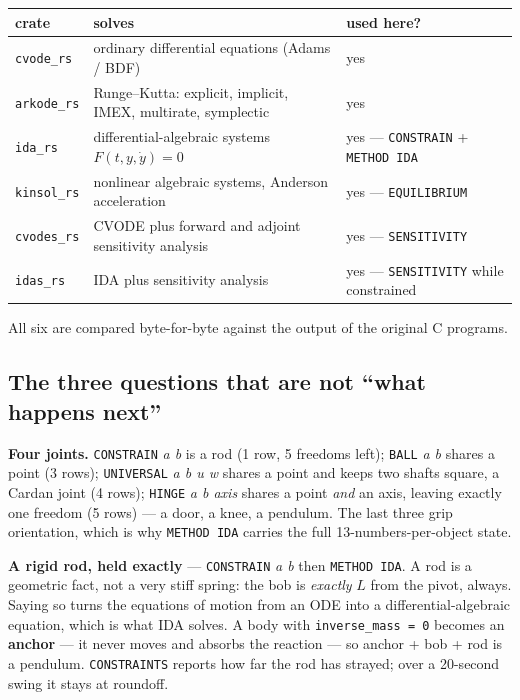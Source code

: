 \documentclass[11pt]{article}
\newcommand{\kw}[1]{\texttt{\uppercase{#1}}}
\newcommand{\code}[1]{\texttt{#1}}
\begin{document}
\begin{center}
\begin{tabular}{lll}
\textbf{crate} & \textbf{solves} & \textbf{used here?}\\\hline
\code{cvode\_rs}  & ordinary differential equations (Adams / BDF) & yes\\
\code{arkode\_rs} & Runge--Kutta: explicit, implicit, IMEX, multirate, symplectic & yes\\
\code{ida\_rs}    & differential-algebraic systems $F(t,y,\dot y)=0$ & yes --- \kw{constrain} + \kw{method ida}\\
\code{kinsol\_rs} & nonlinear algebraic systems, Anderson acceleration & yes --- \kw{equilibrium}\\
\code{cvodes\_rs} & CVODE plus forward and adjoint sensitivity analysis & yes --- \kw{sensitivity}\\
\code{idas\_rs}   & IDA plus sensitivity analysis & yes --- \kw{sensitivity} while constrained\\
\end{tabular}
\end{center}

All six are compared byte-for-byte against the output of the original C
programs.

\subsection{The three questions that are not ``what happens next''}

\textbf{Four joints.} \kw{constrain} \emph{a b} is a rod (1 row, 5
freedoms left); \kw{ball} \emph{a b} shares a point (3 rows);
\kw{universal} \emph{a b u w} shares a point and keeps two shafts square,
a Cardan joint (4 rows); \kw{hinge} \emph{a b axis} shares a point
\emph{and} an axis, leaving exactly one freedom (5 rows) --- a door, a
knee, a pendulum. The last three grip orientation, which is why
\kw{method ida} carries the full 13-numbers-per-object state.

\textbf{A rigid rod, held exactly} --- \kw{constrain} \emph{a b} then
\kw{method ida}. A rod is a geometric fact, not a very stiff spring: the
bob is \emph{exactly} $L$ from the pivot, always. Saying so turns the
equations of motion from an ODE into a differential-algebraic equation,
which is what IDA solves. A body with \code{inverse\_mass = 0} becomes
an \textbf{anchor} --- it never moves and absorbs the reaction --- so
anchor + bob + rod is a pendulum. \kw{constraints} reports how far the
rod has strayed; over a 20-second swing it stays at roundoff.
\end{document}
